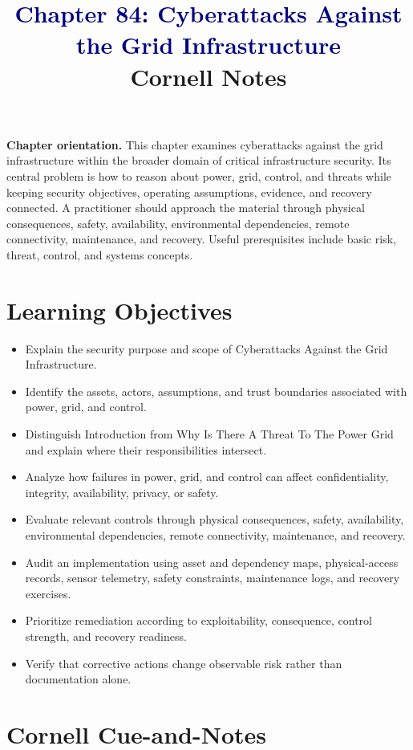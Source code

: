\documentclass[11pt]{article}
\title{\textcolor{Navy}{Chapter 84: Cyberattacks Against the Grid Infrastructure}\\[2mm]\large Cornell Notes}
\author{}
\date{}
\begin{document}
\maketitle
\thispagestyle{fancy}
\vspace{-1.5em}
\begin{orientationbox}
\textbf{Chapter orientation.} This chapter examines cyberattacks against the grid infrastructure within the broader domain of critical infrastructure security. Its central problem is how to reason about power, grid, control, and threats while keeping security objectives, operating assumptions, evidence, and recovery connected. A practitioner should approach the material through physical consequences, safety, availability, environmental dependencies, remote connectivity, maintenance, and recovery. Useful prerequisites include basic risk, threat, control, and systems concepts.
\end{orientationbox}
\section*{Learning Objectives}
\begin{itemize}
\item Explain the security purpose and scope of Cyberattacks Against the Grid Infrastructure.
\item Identify the assets, actors, assumptions, and trust boundaries associated with power, grid, and control.
\item Distinguish Introduction from Why Is There A Threat To The Power Grid and explain where their responsibilities intersect.
\item Analyze how failures in power, grid, and control can affect confidentiality, integrity, availability, privacy, or safety.
\item Evaluate relevant controls through physical consequences, safety, availability, environmental dependencies, remote connectivity, maintenance, and recovery.
\item Audit an implementation using asset and dependency maps, physical-access records, sensor telemetry, safety constraints, maintenance logs, and recovery exercises.
\item Prioritize remediation according to exploitability, consequence, control strength, and recovery readiness.
\item Verify that corrective actions change observable risk rather than documentation alone.
\end{itemize}
\section*{Cornell Cue-and-Notes}
\end{document}
